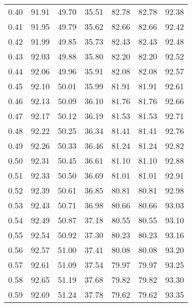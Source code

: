 \begin{tabular}{|c|c|c|c|c|c|c|}
      0.40 &     91.91 &     49.70 &      35.51 &   82.78 &      82.78 &         92.38 \\
      0.41 &     91.95 &     49.79 &      35.62 &   82.66 &      82.66 &         92.42 \\
      0.42 &     91.99 &     49.85 &      35.73 &   82.43 &      82.43 &         92.48 \\
      0.43 &     92.03 &     49.88 &      35.80 &   82.20 &      82.20 &         92.52 \\
      0.44 &     92.06 &     49.96 &      35.91 &   82.08 &      82.08 &         92.57 \\
      0.45 &     92.10 &     50.01 &      35.99 &   81.91 &      81.91 &         92.61 \\
      0.46 &     92.13 &     50.09 &      36.10 &   81.76 &      81.76 &         92.66 \\
      0.47 &     92.17 &     50.12 &      36.19 &   81.53 &      81.53 &         92.71 \\
      0.48 &     92.22 &     50.25 &      36.34 &   81.41 &      81.41 &         92.76 \\
      0.49 &     92.26 &     50.33 &      36.46 &   81.24 &      81.24 &         92.82 \\
      0.50 &     92.31 &     50.45 &      36.61 &   81.10 &      81.10 &         92.88 \\
      0.51 &     92.33 &     50.50 &      36.69 &   81.01 &      81.01 &         92.91 \\
      0.52 &     92.39 &     50.61 &      36.85 &   80.81 &      80.81 &         92.98 \\
      0.53 &     92.43 &     50.71 &      36.98 &   80.66 &      80.66 &         93.03 \\
      0.54 &     92.49 &     50.87 &      37.18 &   80.55 &      80.55 &         93.10 \\
      0.55 &     92.54 &     50.92 &      37.30 &   80.23 &      80.23 &         93.16 \\
      0.56 &     92.57 &     51.00 &      37.41 &   80.08 &      80.08 &         93.20 \\
      0.57 &     92.61 &     51.09 &      37.54 &   79.97 &      79.97 &         93.25 \\
      0.58 &     92.65 &     51.19 &      37.68 &   79.82 &      79.82 &         93.30 \\
      0.59 &     92.69 &     51.24 &      37.78 &   79.62 &      79.62 &         93.35 \\

\end{tabular}
